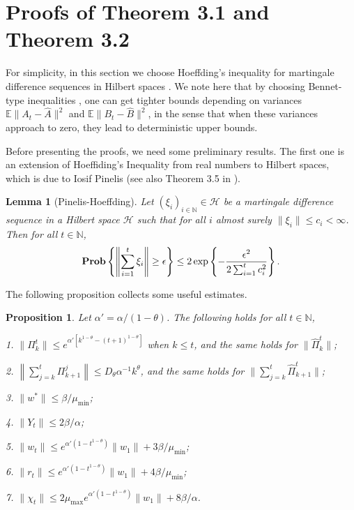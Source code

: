 \documentclass[twoside,twocolumn,journal]{IEEEtran}
\newtheorem{lem}[thm]{Lemma}
\newtheorem{prop}[thm]{Proposition}
\def\N{{\mathbb N}}
\def\E{{\mathbb E}}        %
\def\H{{\mathscr H}}
\def\Prob{{\bf Prob}}
\def\amax{{\mu_{\max}}}
\def\amin{{\mu_{\min}} }
\begin{document}
\section{Proofs of Theorem 3.1 and Theorem 3.2}

For simplicity, in this section we choose Hoeffding's inequality for martingale difference sequences in
Hilbert spaces \cite{Pinelis92}. We note here that by choosing Bennet-type inequalities \cite{Pinelis94},
one can get tighter bounds depending on variances $\E\|A_t - \hat{A}\|^2$ and $\E\|B_t-\hat{B}\|^2$, in the sense that when these
variances approach to zero, they lead to deterministic upper bounds.

Before presenting the proofs, we need some preliminary results. The first one is an extension of Hoeffiding's Inequality from real numbers to
Hilbert spaces, which is due to Iosif Pinelis \cite{Pinelis92} (see also Theorem 3.5 in \cite{Pinelis94}).

\medskip

\begin{lem}[Pinelis-Hoeffding] \label{lem:pinelis}
Let $(\xi_i)_{i\in \N}\in \H$ be a martingale difference sequence in a Hilbert space $\H$ such that for all $i$ almost surely
$\|\xi_i\|\leq c_i<\infty$. Then for all $t\in \N$,
\[ \Prob \left\{ \left\|\sum_{i=1}^t \xi_i \right\| \geq \epsilon \right\} \leq
2 \exp \left\{-\frac{\epsilon^2}{2\sum_{i=1}^t c_i^2} \right\}. \]
\end{lem}

\medskip

The following proposition collects some useful estimates.

\medskip

\begin{prop} \label{prop:bounds} Let $\alpha'=\alpha/(1-\theta)$. The following holds for all $t\in \N$,

1. $\|\Pi_k^t \| \leq e^{\alpha'[k^{1-\theta} - (t+1)^{1-\theta}]}$ when $k\leq t$, and the same holds for $\|\hat{\Pi}_k^t\|$;

2. $\left\|\sum_{j=k}^t \Pi_{k+1}^j \right\| \leq D_\theta \alpha^{-1} k^\theta$, and the same holds for $\|\sum_{j=k}^t\hat{\Pi}_{k+1}^t\|$;

3. $\| w^\ast  \| \leq \beta/\amin$;

4. $\|Y_t \| \leq 2 \beta/\alpha$;

5. $\|w_t\| \leq  e^{\alpha'(1-t^{1-\theta})} \|w_1\|+ 3\beta/\amin$;

6. $\|r_t\| \leq  e^{\alpha'(1-t^{1-\theta})} \|w_1\|+ 4\beta/\amin$;

7. $\| \chi_t\| \leq  2\amax e^{\alpha'(1-t^{1-\theta})} \|w_1\| + 8\beta/\alpha$.
\end{prop}
\end{document}

